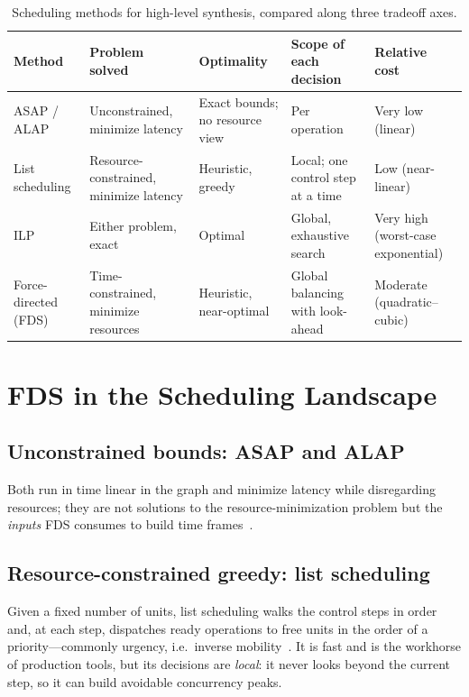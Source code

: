 \documentclass[conference]{IEEEtran}
\begin{document}
\begin{table}[t]
\caption{Scheduling methods for high-level synthesis, compared along three tradeoff axes.}
\label{tab:compare}
\centering
\footnotesize
\setlength{\tabcolsep}{4pt}
\renewcommand{\arraystretch}{1.3}
\begin{tabular}{>{\raggedright\arraybackslash}p{2.0cm}
                >{\raggedright\arraybackslash}p{3.5cm}
                >{\raggedright\arraybackslash}p{3.1cm}
                >{\raggedright\arraybackslash}p{4.0cm}
                >{\raggedright\arraybackslash}p{3.2cm}}
\hline
\textbf{Method} & \textbf{Problem solved} & \textbf{Optimality} &
\textbf{Scope of each decision} & \textbf{Relative cost} \\
\hline
ASAP / ALAP          & Unconstrained, minimize latency        & Exact bounds; no resource view & Per operation                     & Very low (linear) \\
List scheduling      & Resource-constrained, minimize latency & Heuristic, greedy              & Local; one control step at a time & Low (near-linear) \\
ILP                  & Either problem, exact                  & Optimal                        & Global, exhaustive search         & Very high (worst-case exponential) \\
Force-directed (FDS) & Time-constrained, minimize resources   & Heuristic, near-optimal        & Global balancing with look-ahead  & Moderate (quadratic--cubic) \\
\hline
\end{tabular}
\end{table}

\section{FDS in the Scheduling Landscape}\label{sec:landscape}

\subsection{Unconstrained bounds: ASAP and ALAP}
Both run in time linear in the graph and minimize latency while disregarding
resources; they are not solutions to the resource-minimization problem but the
\emph{inputs} FDS consumes to build time frames~\cite{b2}.

\subsection{Resource-constrained greedy: list scheduling}
Given a fixed number of units, list scheduling walks the control steps in
order and, at each step, dispatches ready operations to free units in the order
of a priority---commonly urgency, i.e.\ inverse mobility~\cite{b2}. It is fast
and is the workhorse of production tools, but its decisions are \emph{local}:
it never looks beyond the current step, so it can build avoidable concurrency
peaks.
\end{document}

